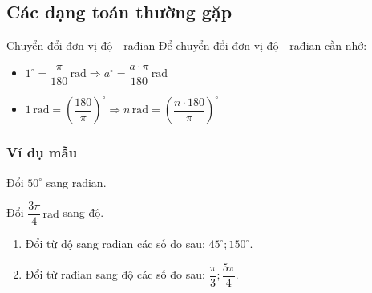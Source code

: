 \subsection{Các dạng toán thường gặp}
\begin{dang}{Chuyển đổi đơn vị độ - rađian}
	Để chuyển đổi đơn vị độ - rađian cần nhớ:
	\begin{itemize}
		\item $1^\circ=\dfrac{\pi}{180}\,\mathrm{rad}\Rightarrow a^\circ=\dfrac{a\cdot\pi}{180}\,\mathrm{rad}$
		\item $1\,\mathrm{rad}=\left(\dfrac{180}{\pi}\right)^\circ\Rightarrow n\,  \mathrm{rad}=\left(\dfrac{n\cdot180}{\pi}\right)^\circ$
	\end{itemize}
\end{dang}
\subsubsection{Ví dụ mẫu}
\begin{vd}%
	Đổi $50^\circ$ sang rađian.
\end{vd}
\begin{vd}%
	Đổi $\dfrac{3\pi}{4}\,\mathrm{rad}$ sang độ.
\end{vd}
\begin{vd}%
	\begin{enumerate}
		\item Đổi từ độ sang rađian các số đo sau: $45^{\circ} ; 150^{\circ}$.
		\item Đổi từ rađian sang độ các số đo sau: $\dfrac{\pi}{3} ; \dfrac{5 \pi}{4}$.
	\end{enumerate}
\end{vd}
